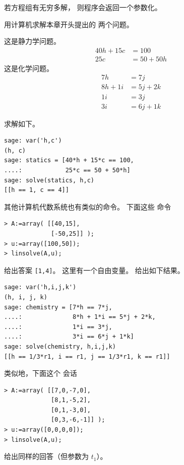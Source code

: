 若方程组有无穷多解，
则程序会返回一个参数化。


\begin{exercises}
  \item 
    用计算机求解本章开头提出的
    两个问题。
    \begin{exparts}
      \partsitem 这是静力学问题。
         \begin{align*}
            40h+15c  &= 100  \\
            25c      &= 50+50h
         \end{align*}
      \partsitem 这是化学问题。
         \begin{align*} 
             7h      &= 7j  \\
             8h +1i  &= 5j+2k  \\
             1i      &= 3j  \\
             3i      &= 6j+1k
         \end{align*}
    \end{exparts}
    \begin{answer}
      \begin{exparts}
        \partsitem 
\Sage{} 求解如下。
\begin{lstlisting}
sage: var('h,c')
(h, c)
sage: statics = [40*h + 15*c == 100,
....:            25*c == 50 + 50*h]
sage: solve(statics, h,c)
[[h == 1, c == 4]] 
\end{lstlisting}
其他计算机代数系统也有类似的命令。
下面这些 \Maple{} 命令
\begin{lstlisting}
> A:=array( [[40,15],
             [-50,25]] );
> u:=array([100,50]);
> linsolve(A,u);
\end{lstlisting}
           给出答案 \lstinline![1,4]!。
        \partsitem 这里有一个自由变量。
\Sage{} 给出如下结果。
\begin{lstlisting}
sage: var('h,i,j,k')
(h, i, j, k)
sage: chemistry = [7*h == 7*j,
....:              8*h + 1*i == 5*j + 2*k,
....:              1*i == 3*j,
....:              3*i == 6*j + 1*k]
sage: solve(chemistry, h,i,j,k)
[[h == 1/3*r1, i == r1, j == 1/3*r1, k == r1]]          
\end{lstlisting}
类似地，下面这个 \Maple{} 会话
\begin{lstlisting}
> A:=array( [[7,0,-7,0],
             [8,1,-5,2],
             [0,1,-3,0],
             [0,3,-6,-1]] );
> u:=array([0,0,0,0]);
> linsolve(A,u);
\end{lstlisting}
         给出同样的回答（但参数为 $t_1$）。
      \end{exparts}
    \end{answer}

\end{exercises}

